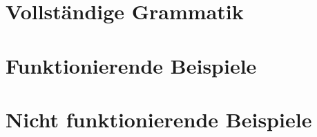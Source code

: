 \newpage

\begin{appendix}

\section{Vollständige Grammatik}
\label{sec:fullgrammar}



\section{Funktionierende Beispiele}
\label{sec:good_examples}


\section{Nicht funktionierende Beispiele}
\label{sec:bad_examples}


\end{appendix}

